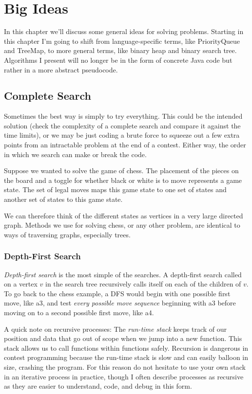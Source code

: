 \chapter{Big Ideas}

In this chapter we'll discuss some general ideas for solving problems. Starting in this chapter I'm going to shift from language-specific terms, like PriorityQueue and TreeMap, to more general terms, like binary heap and binary search tree. Algorithms I present will no longer be in the form of concrete Java code but rather in a more abstract pseudocode.

\section{Complete Search}

Sometimes the best way is simply to try everything. This could be the intended solution (check the complexity of a complete search and compare it against the time limits), or we may be just coding a brute force to squeeze out a few extra points from an intractable problem at the end of a contest. Either way, the order in which we search can make or break the code.

Suppose we wanted to solve the game of chess. The placement of the pieces on the board and a toggle for whether black or white is to move represents a game state. The set of legal moves maps this game state to one set of states and another set of states to this game state.

We can therefore think of the different states as vertices in a very large directed graph. Methods we use for solving chess, or any other problem, are identical to ways of traversing graphs, especially trees.

\subsection{Depth-First Search}

\textit{Depth-first search} is the most simple of the searches. A depth-first search called on a vertex $v$ in the search tree recursively calls itself on each of the children of $v$. To go back to the chess example, a DFS would begin with one possible first move, like a3, and test \textit{every possible move sequence} beginning with a3 before moving on to a second possible first move, like a4.

A quick note on recursive processes: The \textit{run-time stack} keeps track of our position and data that go out of scope when we jump into a new function. This stack allows us to call functions within functions safely. Recursion is dangerous in contest programming because the run-time stack is slow and can easily balloon in size, crashing the program. For this reason do not hesitate to use your own stack in an iterative process in practice, though I often describe processes as recursive as they are easier to understand, code, and debug in this form.

